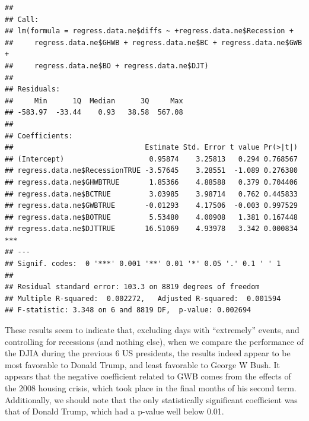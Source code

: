 \documentclass[]{article}
\newenvironment{Shaded}{\begin{snugshade}}{\end{snugshade}}
\newcommand{\FloatTok}[1]{\textcolor[rgb]{0.00,0.00,0.81}{#1}}
\newcommand{\KeywordTok}[1]{\textcolor[rgb]{0.13,0.29,0.53}{\textbf{#1}}}
\newcommand{\NormalTok}[1]{#1}
\newcommand{\OperatorTok}[1]{\textcolor[rgb]{0.81,0.36,0.00}{\textbf{#1}}}
\newcommand{\StringTok}[1]{\textcolor[rgb]{0.31,0.60,0.02}{#1}}
\begin{document}
\begin{Shaded}
\end{Shaded}

\begin{verbatim}
## 
## Call:
## lm(formula = regress.data.ne$diffs ~ +regress.data.ne$Recession + 
##     regress.data.ne$GHWB + regress.data.ne$BC + regress.data.ne$GWB + 
##     regress.data.ne$BO + regress.data.ne$DJT)
## 
## Residuals:
##     Min      1Q  Median      3Q     Max 
## -583.97  -33.44    0.93   38.58  567.08 
## 
## Coefficients:
##                               Estimate Std. Error t value Pr(>|t|)    
## (Intercept)                    0.95874    3.25813   0.294 0.768567    
## regress.data.ne$RecessionTRUE -3.57645    3.28551  -1.089 0.276380    
## regress.data.ne$GHWBTRUE       1.85366    4.88588   0.379 0.704406    
## regress.data.ne$BCTRUE         3.03985    3.98714   0.762 0.445833    
## regress.data.ne$GWBTRUE       -0.01293    4.17506  -0.003 0.997529    
## regress.data.ne$BOTRUE         5.53480    4.00908   1.381 0.167448    
## regress.data.ne$DJTTRUE       16.51069    4.93978   3.342 0.000834 ***
## ---
## Signif. codes:  0 '***' 0.001 '**' 0.01 '*' 0.05 '.' 0.1 ' ' 1
## 
## Residual standard error: 103.3 on 8819 degrees of freedom
## Multiple R-squared:  0.002272,   Adjusted R-squared:  0.001594 
## F-statistic: 3.348 on 6 and 8819 DF,  p-value: 0.002694
\end{verbatim}

These results seem to indicate that, excluding days with ``extremely''
events, and controlling for recessions (and nothing else), when we
compare the performance of the DJIA during the previous 6 US presidents,
the results indeed appear to be most favorable to Donald Trump, and
least favorable to George W Bush. It appears that the negative
coefficient related to GWB comes from the effects of the 2008 housing
crisis, which took place in the final months of his second term.
Additionally, we should note that the only statistically significant
coefficient was that of Donald Trump, which had a p-value well below
0.01.
\end{document}
